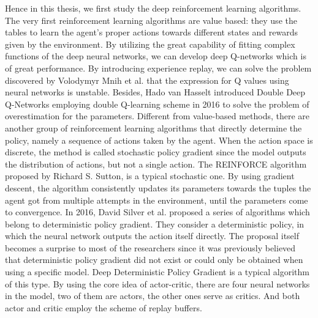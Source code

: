 \begin{bigabstract}
Hence in this thesis, we first study the deep reinforcement learning algorithms. The very first reinforcement learning algorithms are value based: they use the tables to learn the agent’s proper actions towards different states and rewards given by the environment. By utilizing the great capability of fitting complex functions of the deep neural networks, we can develop deep Q-networks which is of great performance. By introducing experience replay, we can solve the problem discovered by Volodymyr Mnih et al. that the expression for Q values using neural networks is unstable. Besides, Hado van Hasselt introduced Double Deep Q-Networks employing double Q-learning scheme in 2016 to solve the problem of overestimation for the parameters. Different from value-based methods, there are another group of reinforcement learning algorithms that directly determine the policy, namely a sequence of actions taken by the agent. When the action space is discrete, the method is called stochastic policy gradient since the model outputs the distribution of actions, but not a single action. The REINFORCE algorithm proposed by Richard S. Sutton, is a typical stochastic one. By using gradient descent, the algorithm consistently updates its parameters towards the tuples the agent got from multiple attempts in the environment, until the parameters come to convergence. In 2016, David Silver et al. proposed a series of algorithms which belong to deterministic policy gradient. They consider a deterministic policy, in which the neural network outputs the action itself directly. The proposal itself becomes a surprise to most of the researchers since it was previously believed that deterministic policy gradient did not exist or could only be obtained when using a specific model. Deep Deterministic Policy Gradient is a typical algorithm of this type. By using the core idea of actor-critic, there are four neural networks in the model, two of them are actors, the other ones serve as critics. And both actor and critic employ the scheme of replay buffers.


\end{bigabstract}
